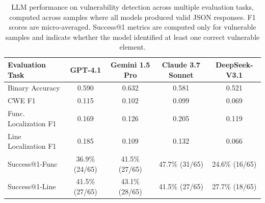 \begin{table}[htbp]
\centering
\caption{LLM performance on vulnerability detection across multiple evaluation tasks, computed across samples where all models produced valid JSON responses. F1 scores are micro-averaged. Success@1 metrics are computed only for vulnerable samples and indicate whether the model identified at least one correct vulnerable element.}
\label{tab:vanilla_performance}
\begin{tabular}{lcccc}
\toprule
\textbf{Evaluation Task} & \textbf{GPT-4.1} & \textbf{Gemini 1.5 Pro} & \textbf{Claude 3.7 Sonnet} & \textbf{DeepSeek-V3.1} \\
\midrule
Binary Accuracy & 0.590 & 0.632 & 0.581 & 0.521 \\
CWE F1 & 0.115 & 0.102 & 0.099 & 0.069 \\
Func. Localization F1 & 0.169 & 0.126 & 0.205 & 0.119 \\
Line Localization F1 & 0.185 & 0.109 & 0.132 & 0.066 \\
Success@1-Func & 36.9\% (24/65) & 41.5\% (27/65) & 47.7\% (31/65) & 24.6\% (16/65) \\
Success@1-Line & 41.5\% (27/65) & 43.1\% (28/65) & 41.5\% (27/65) & 27.7\% (18/65) \\
\bottomrule
\end{tabular}
\end{table}